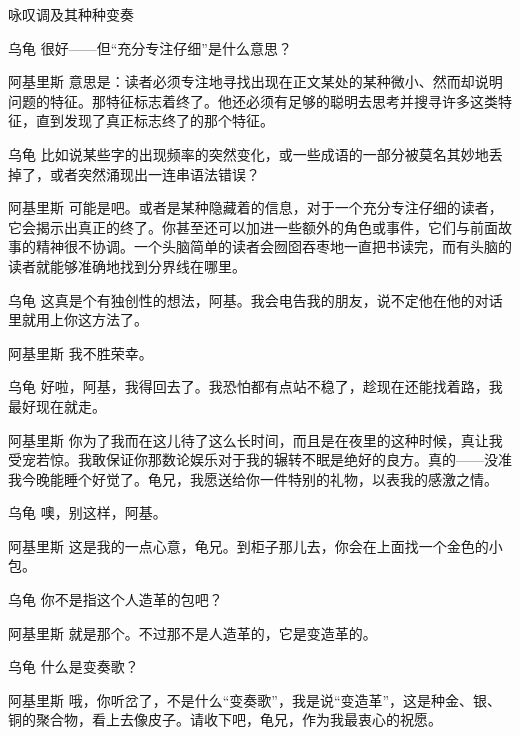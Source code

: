 \begin{dialog}{咏叹调及其种种变奏}
\begin{dialogue}
\item[乌龟]很好——但“充分专注仔细”是什么意思？

\item[阿基里斯]意思是：读者必须专注地寻找出现在正文某处的某种微小、然而却说明问题的特征。那特征标志着终了。他还必须有足够的聪明去思考并搜寻许多这类特征，直到发现了真正标志终了的那个特征。

\item[乌龟]比如说某些字的出现频率的突然变化，或一些成语的一部分被莫名其妙地丢掉了，或者突然涌现出一连串语法错误？

\item[阿基里斯]可能是吧。或者是某种隐藏着的信息，对于一个充分专注仔细的读者，它会揭示出真正的终了。你甚至还可以加进一些额外的角色或事件，它们与前面故事的精神很不协调。一个头脑简单的读者会囫囵吞枣地一直把书读完，而有头脑的读者就能够准确地找到分界线在哪里。

\item[乌龟]这真是个有独创性的想法，阿基。我会电告我的朋友，说不定他在他的对话里就用上你这方法了。

\item[阿基里斯]我不胜荣幸。

\item[乌龟]好啦，阿基，我得回去了。我恐怕都有点站不稳了，趁现在还能找着路，我最好现在就走。

\item[阿基里斯]你为了我而在这儿待了这么长时间，而且是在夜里的这种时候，真让我受宠若惊。我敢保证你那数论娱乐对于我的辗转不眠是绝好的良方。真的——没准我今晚能睡个好觉了。龟兄，我愿送给你一件特别的礼物，以表我的感激之情。

\item[乌龟]噢，别这样，阿基。

\item[阿基里斯]这是我的一点心意，龟兄。到柜子那儿去，你会在上面找一个金色的小包。


\item[乌龟]你不是指这个人造革的包吧？

\item[阿基里斯]就是那个。不过那不是人造革的，它是变造革的。

\item[乌龟]什么是变奏歌？

\item[阿基里斯]哦，你听岔了，不是什么“变奏歌”，我是说“变造革”，这是种金、银、铜的聚合物，看上去像皮子。请收下吧，龟兄，作为我最衷心的祝愿。


\end{dialogue}
\end{dialog}
